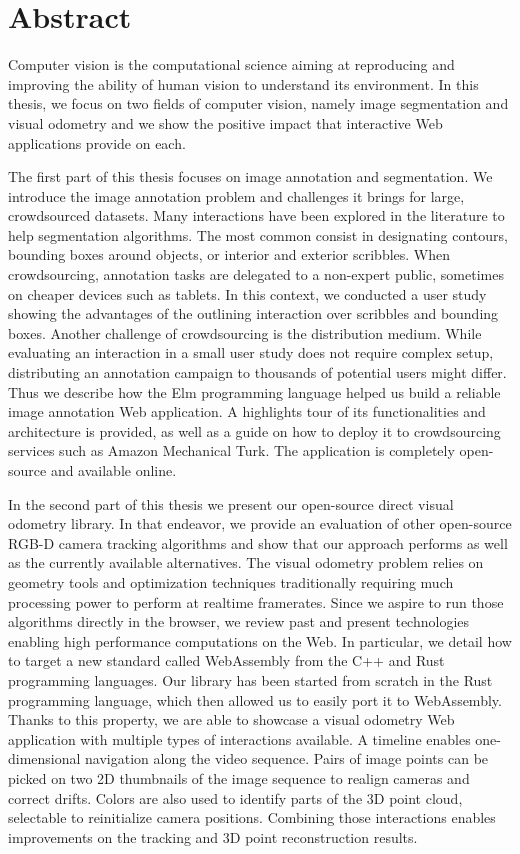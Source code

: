 \section*{Abstract}%
\label{sec:Abstract}

Computer vision is the computational science aiming at reproducing and improving
the ability of human vision to understand its environment.
In this thesis, we focus on two fields of computer vision, namely image segmentation
and visual odometry and
we show the positive impact that interactive Web applications provide on each.

The first part of this thesis focuses on image annotation and segmentation.
We introduce the image annotation problem
and challenges it brings for large, crowdsourced datasets.
Many interactions have been explored in the literature to help segmentation algorithms.
The most common consist in designating contours,
bounding boxes around objects,
or interior and exterior scribbles.
When crowdsourcing, annotation tasks are delegated
to a non-expert public, sometimes on cheaper devices such as tablets.
In this context, we conducted a user study showing
the advantages of the outlining interaction over scribbles and bounding boxes.
Another challenge of crowdsourcing is the distribution medium.
While evaluating an interaction in a small user study does not require complex setup,
distributing an annotation campaign to thousands of potential users might differ.
Thus we describe how the Elm programming language helped us
build a reliable image annotation Web application.
A highlights tour of its functionalities and architecture is provided,
as well as a guide on how to deploy it to crowdsourcing services
such as Amazon Mechanical Turk.
The application is completely open-source and available online.

In the second part of this thesis we present our open-source
direct visual odometry library.
In that endeavor, we provide an evaluation of other open-source
RGB-D camera tracking algorithms and show that our approach
performs as well as the currently available alternatives.
The visual odometry problem relies on geometry tools and optimization techniques
traditionally requiring much processing power to perform at realtime framerates.
Since we aspire to run those algorithms directly in the browser,
we review past and present technologies
enabling high performance computations on the Web.
In particular, we detail how to target a new standard called WebAssembly from
the C++ and Rust programming languages.
Our library has been started from scratch in the Rust programming language,
which then allowed us to easily port it to WebAssembly.
Thanks to this property, we are able to showcase
a visual odometry Web application with multiple types of interactions available.
A timeline enables one-dimensional navigation along the video sequence.
Pairs of image points can be picked on two 2D thumbnails
of the image sequence to realign cameras and correct drifts.
Colors are also used to identify parts of the 3D point cloud,
selectable to reinitialize camera positions.
Combining those interactions enables improvements
on the tracking and 3D point reconstruction results.
